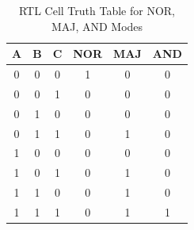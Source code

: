 \begin{table}[h]
\centering
\caption{RTL Cell Truth Table for NOR, MAJ, AND Modes}
\begin{tabular}{ccc|c|c|c}
\hline
A & B & C & NOR & MAJ & AND \\
\hline
0 & 0 & 0 & 1 & 0 & 0 \\
0 & 0 & 1 & 0 & 0 & 0 \\
0 & 1 & 0 & 0 & 0 & 0 \\
0 & 1 & 1 & 0 & 1 & 0 \\
1 & 0 & 0 & 0 & 0 & 0 \\
1 & 0 & 1 & 0 & 1 & 0 \\
1 & 1 & 0 & 0 & 1 & 0 \\
1 & 1 & 1 & 0 & 1 & 1 \\
\hline
\end{tabular}
\end{table}

